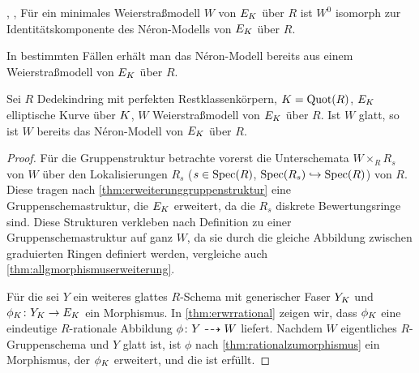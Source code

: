 \documentclass[german]{scrreprt}
\begin{document}
\begin{Bemerkung}
  \cite[Chapter 1.5, S.\,23]{neron},
  \cite[Corollary IV.9.1]{silverman2},
  \cite[S. 46]{tate}
  Für ein minimales Weierstraßmodell $W$ von $E_{K}$ über $R$
  ist $W^0$ isomorph zur Identitätskomponente des Néron-Modells von
  $E_{K}$ über $R$.
\end{Bemerkung}


In bestimmten Fällen erhält man das Néron-Modell bereits aus einem
Weierstraßmodell von $E_{K}$ über $R$.
\begin{Korollar}\label{thm:neronmausweierstrassgl}
  Sei $R$ Dedekindring mit perfekten Restklassenkörpern, $K=\operatorname{Quot}(R)$,
  $E_{K}$ elliptische Kurve über $K$, $W$ Weierstraßmodell von $E_{K}$
  über $R$.
  Ist $W$ glatt, so ist $W$ bereits das Néron-Modell von $E_{K}$ über
  $R$.
  \begin{proof}
    Für die Gruppenstruktur betrachte vorerst die Unterschemata
    $W\times_R R_s$ von $W$ über den Lokalisierungen
    $R_s$ ($s\in\operatorname{Spec}(R)$, $\operatorname{Spec}(R_s)\hookrightarrow\operatorname{Spec}(R)$) von $R$.
    Diese tragen nach \ref{thm:erweiterunggruppenstruktur} eine
    Gruppenschemastruktur, die $E_{K}$ erweitert, da die $R_s$ diskrete
    Bewertungsringe sind.
    Diese Strukturen  verkleben nach Definition zu einer
    Gruppenschemastruktur auf ganz $W$, da sie durch die gleiche
    Abbildung zwischen graduierten Ringen definiert werden, vergleiche
    auch \ref{thm:allgmorphismuserweiterung}.

    Für die \NAbbEig sei $Y$ ein weiteres glattes $R$-Schema mit
    generischer Faser $Y_{K}$ und $\phi_{K}\colon Y_{K}\to E_{K}$ ein
    Morphismus.
    In \ref{thm:erwrrational} zeigen wir, dass $\phi_{K}$ eine
    eindeutige $R$-rationale Abbildung $\phi\colon Y\dashrightarrow W$ liefert.
    Nachdem $W$ eigentliches $R$-Gruppenschema und $Y$ glatt ist, ist
    $\phi$ nach \ref{thm:rationalzumorphismus} ein Morphismus, der
    $\phi_{K}$ erweitert, und die \NAbbEig ist erfüllt.
  \end{proof}
\end{Korollar}
\end{document}
